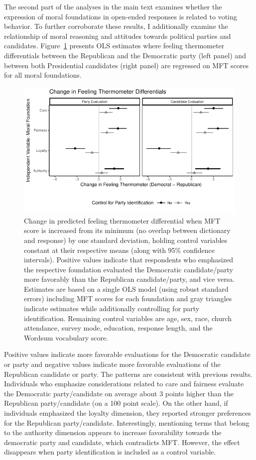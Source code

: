 \documentclass[12pt]{article}
\begin{document}
The second part of the analyses in the main text examines whether the expression of moral foundations in open-ended responses is related to voting behavior. To further corroborate these results, I additionally examine the relationship of moral reasoning and attitudes towards political parties and candidates. Figure~\ref{fig:ols_feel} presents OLS estimates where feeling thermometer differentials between the Republican and the Democratic party (left panel) and between both Presidential candidates (right panel) are regressed on MFT scores for all moral foundations. 


\begin{figure}[ht]\centering
\includegraphics{../calc/fig/ols_feel.pdf}
\caption{Change in predicted feeling thermometer differential when MFT score is increased from its minimum (no overlap between dictionary and response) by one standard deviation, holding control variables constant at their respective means (along with 95\% confidence intervals). Positive values indicate that respondents who emphasized the respective foundation evaluated the Democratic candidate/party more favorably than the Republican candidate/party, and vice versa. Estimates are based on a single OLS model (using robust standard errors) including MFT scores for each foundation and gray triangles indicate estimates while additionally controlling for party identification. Remaining control variables are age, sex, race, church attendance, survey mode, education, response length, and the Wordsum vocabulary score.
}\label{fig:ols_feel}
\end{figure}

Positive values indicate more favorable evaluations for the Democratic candidate or party and negative values indicate more favorable evaluations of the Republican candidate or party. The patterns are consistent with previous results. Individuals who emphasize considerations related to care and fairness evaluate the Democratic party/candidate on average about 3 points higher than the Republican party/candidate (on a 100 point scale). On the other hand, if individuals emphasized the loyalty dimension, they reported stronger preferences for the Republican party/candidate. Interestingly, mentioning terms that belong to the authority dimension appears to increase favorability towards the democratic party and candidate, which contradicts MFT. However, the effect disappears when party identification is included as a control variable.
\end{document}
